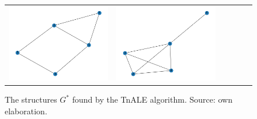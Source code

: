 \documentclass[11pt,a4paper,openright,oneside]{book}
\numberwithin{equation}{section}
\begin{document}
{\begin{figure}[h]
\begin{adjustwidth}{-3cm}{-3cm}
\begin{tabular}{>{\centering\arraybackslash}m{1.5cm} m{2.5cm} m{2.5cm} m{2.5cm} m{2.5cm} m{2.5cm}}
        \rule{0pt}{0.01cm} \includegraphics[width=\linewidth]{media/tnale/graph-4-tnale-12.png} \rule{0pt}{0.01cm}&
        \rule{0pt}{0.01cm} \includegraphics[width=\linewidth]{media/tnale/graph-5-tnale-12.png} \rule{0pt}{0.01cm}\\
   \end{tabular}
\end{adjustwidth}

    \caption{The structures $G^*$ found by the TnALE algorithm. Source: own elaboration.}
    \label{fig:ap-lots-of-graphs}
\end{figure}




\begin{figure}[h]


\end{figure}}
\end{document}
